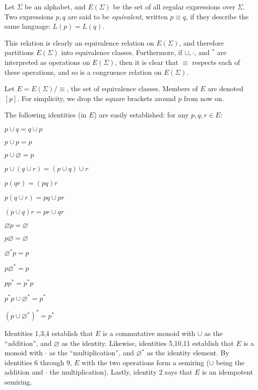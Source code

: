 \documentclass[12pt]{article}
\begin{document}
Let $\Sigma$ be an alphabet, and $E(\Sigma)$ be the set of all regular expressions over $\Sigma$.  Two expressions $p,q$ are said to be \emph{equivalent}, written $p\equiv q$, if they describe the same language: $L(p)=L(q)$.  

This relation is clearly an equivalence relation on $E(\Sigma)$, and therefore partitions $E(\Sigma)$ into equivalence classes.  Furthermore, if $\cup,\cdot$, and $^*$ are interpreted as operations on $E(\Sigma)$, then it is clear that $\equiv$ respects each of these operations, and so is a congruence relation on $E(\Sigma)$.

Let $E=E(\Sigma)/\equiv$, the set of equivalence classes.  Members of $E$ are denoted $[p]$.  For simplicity, we drop the square brackets around $p$ from now on.

The following identities (in $E$) are easily established: for any $p,q,r\in E$:

\begin{enumerate}
\begin{multicols}{3}{
\item $p\cup q = q\cup p$\\ [-3ex]
\item $p\cup p=  p$\\[-3ex]
\item $p\cup \varnothing = p$ \\[-3ex]
\item $p\cup (q\cup r) = (p\cup q)\cup r$\\[-3ex]
\item $p(qr) = (pq)r$\\[-3ex]
\item $p(q\cup r) = pq \cup pr$\\[-3ex]
\item $(p\cup q)r = pr \cup qr$\\[-3ex]
\item $\varnothing p=\varnothing$\\[-3ex]
\item $p\varnothing=\varnothing$\\[-3ex]
\item $\varnothing^* p = p$\\[-3ex]
\item $p\varnothing^*  = p$\\[-3ex]
\item $pp^*=p^*p$\\[-3ex]
\item $p^*p \cup \varnothing^* = p^*$\\[-3ex]
\item $(p\cup \varnothing^*)^* = p^*$\\[-3ex]
}\end{multicols}
\end{enumerate}
Identities 1,3,4 establish that $E$ is a commutative monoid with $\cup$ as the ``addition'', and $\varnothing$ as the identity.  Likewise, identities 5,10,11 establish that $E$ is a monoid with $\cdot$ as the ``multiplication'', and $\varnothing^*$ as the identity element.  By identities 6 through 9, $E$ with the two operations form a semiring ($\cup$ being the addition and $\cdot$ the multiplication).  Lastly, identity 2 says that $E$ is an idempotent semiring.  
\end{document}
